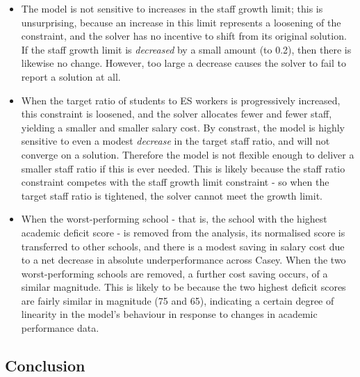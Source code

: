 \documentclass[11pt, a4paper]{article}
\begin{document}
    \begin{itemize}
        \item The model is not sensitive to increases in the staff growth limit; this is unsurprising, because an increase in this limit represents a loosening of the constraint, and the solver has no incentive to shift from its original solution. If the staff growth limit is \textit{decreased} by a small amount (to 0.2), then there is likewise no change. However, too large a decrease causes the solver to fail to report a solution at all.
        \item When the target ratio of students to ES workers is progressively increased, this constraint is loosened, and the solver allocates fewer and fewer staff, yielding a smaller and smaller salary cost. By constrast, the model is highly sensitive to even a modest \textit{decrease} in the target staff ratio, and will not converge on a solution. Therefore the model is not flexible enough to deliver a smaller staff ratio if this is ever needed. This is likely because the staff ratio constraint competes with the staff growth limit constraint - so when the target staff ratio is tightened, the solver cannot meet the growth limit.
        \item When the worst-performing school - that is, the school with the highest academic deficit score - is removed from the analysis, its normalised score is transferred to other schools, and there is a modest saving in salary cost due to a net decrease in absolute underperformance across Casey. When the two worst-performing schools are removed, a further cost saving occurs, of a similar magnitude. This is likely to be because the two highest deficit scores are fairly similar in magnitude (75 and 65), indicating a certain degree of linearity in the model's behaviour in response to changes in academic performance data.
    \end{itemize}
    




    \subsection{Conclusion}



    \newpage

    \printbibliography 
\end{document}
